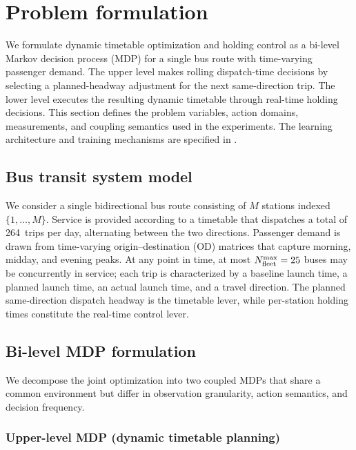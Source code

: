 \section{Problem formulation}
\label{sec:problem}

We formulate dynamic timetable optimization and holding control as a bi-level Markov decision process (MDP) for a single bus route with time-varying passenger demand. The upper level makes rolling dispatch-time decisions by selecting a planned-headway adjustment for the next same-direction trip. The lower level executes the resulting dynamic timetable through real-time holding decisions.
This section defines the problem variables, action domains, measurements, and coupling semantics used in the experiments. The learning architecture and training mechanisms are specified in .

\subsection{Bus transit system model}
\label{sec:transit_model}

We consider a single bidirectional bus route consisting of $M$ stations indexed $\{1,\dots,M\}$.
Service is provided according to a timetable that dispatches a total of 264~trips per day, alternating between the two directions.
Passenger demand is drawn from time-varying origin--destination (OD) matrices that capture morning, midday, and evening peaks.
At any point in time, at most $N_{\mathrm{fleet}}^{\max}=25$ buses may be concurrently in service; each trip is characterized by a baseline launch time, a planned launch time, an actual launch time, and a travel direction.
The planned same-direction dispatch headway is the timetable lever, while per-station holding times constitute the real-time control lever.

\subsection{Bi-level MDP formulation}
\label{sec:bilevel_mdp}

We decompose the joint optimization into two coupled MDPs that share a common environment but differ in observation granularity, action semantics, and decision frequency.

\subsubsection{Upper-level MDP (dynamic timetable planning)}
\label{sec:upper_mdp}

